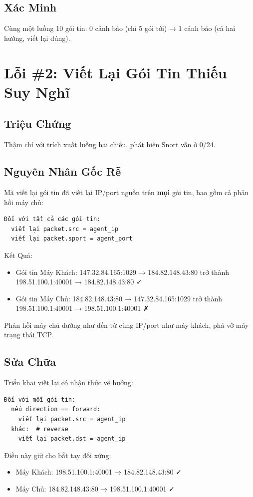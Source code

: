 \documentclass[12pt,a4paper]{report}
\begin{document}
\subsection{Xác Minh}
Cùng một luồng 10 gói tin: 0 cảnh báo (chỉ 5 gói tới) → 1 cảnh báo (cả hai hướng, viết lại đúng).

\section{Lỗi \#2: Viết Lại Gói Tin Thiếu Suy Nghĩ}

\subsection{Triệu Chứng}
Thậm chí với trích xuất luồng hai chiều, phát hiện Snort vẫn ở 0/24.

\subsection{Nguyên Nhân Gốc Rễ}
Mã viết lại gói tin đã viết lại IP/port nguồn trên \textbf{mọi} gói tin, bao gồm cả phản hồi máy chủ:
\begin{verbatim}
Đối với tất cả các gói tin:
  viết lại packet.src = agent_ip
  viết lại packet.sport = agent_port
\end{verbatim}

Kết Quả:
\begin{itemize}
  \item Gói tin Máy Khách: 147.32.84.165:1029 → 184.82.148.43:80 trở thành 198.51.100.1:40001 → 184.82.148.43:80 ✓
  \item Gói tin Máy Chủ: 184.82.148.43:80 → 147.32.84.165:1029 trở thành 198.51.100.1:40001 → 198.51.100.1:40001 ✗
\end{itemize}

Phản hồi máy chủ dường như đến từ cùng IP/port như máy khách, phá vỡ máy trạng thái TCP.

\subsection{Sửa Chữa}
Triển khai viết lại có nhận thức về hướng:
\begin{verbatim}
Đối với mỗi gói tin:
  nếu direction == forward:
    viết lại packet.src = agent_ip
  khác:  # reverse
    viết lại packet.dst = agent_ip
\end{verbatim}

Điều này giữ cho bắt tay đối xứng:
\begin{itemize}
  \item Máy Khách: 198.51.100.1:40001 → 184.82.148.43:80 ✓
  \item Máy Chủ: 184.82.148.43:80 → 198.51.100.1:40001 ✓
\end{itemize}
\end{document}
